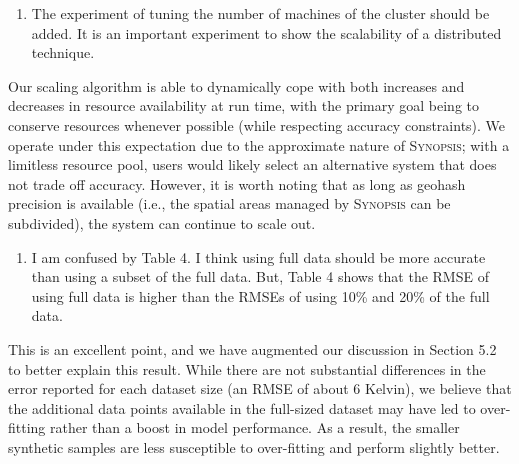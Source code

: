 \documentclass{article}
\begin{document}
\begin{enumerate}
\def\labelenumi{\arabic{enumi})}
\setcounter{enumi}{5}
\item
  The experiment of tuning the number of machines of the cluster should
  be added. It is an important experiment to show the scalability of a
  distributed technique.
\end{enumerate}

\begin{tcolorbox}
    Our scaling algorithm is able to dynamically cope with both increases and decreases in resource availability at run time, with the primary goal being to conserve resources whenever possible (while respecting accuracy constraints). We operate under this expectation due to the approximate nature of \textsc{Synopsis}; with a limitless resource pool, users would likely select an alternative system that does not trade off accuracy. However, it is worth noting that as long as geohash precision is available (i.e., the spatial areas managed by \textsc{Synopsis} can be subdivided), the system can continue to scale out.
\end{tcolorbox}

\begin{enumerate}
\def\labelenumi{\arabic{enumi})}
\setcounter{enumi}{6}
\item
  I am confused by Table 4. I think using full data should be more
  accurate than using a subset of the full data. But, Table 4 shows that
  the RMSE of using full data is higher than the RMSEs of using 10\% and
  20\% of the full data.
\end{enumerate}

\begin{tcolorbox}
This is an excellent point, and we have augmented our discussion in
Section 5.2 to better explain this result. While there are not
substantial differences in the error reported for each dataset size (an
RMSE of about 6 Kelvin), we believe that the additional data points
available in the full-sized dataset may have led to over-fitting rather
than a boost in model performance. As a result, the smaller synthetic
samples are less susceptible to over-fitting and perform slightly
better.
\end{tcolorbox}
\end{document}
